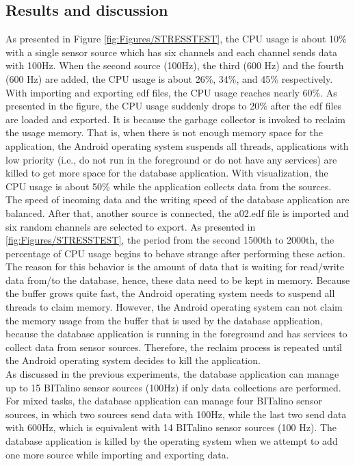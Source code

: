 \subsection{Results and discussion}
As presented in Figure \ref{fig:Figures/STRESSTEST}, the CPU usage is about 10\% with a single sensor source which has six channels and each channel sends data with 100Hz. When the second source (100Hz), the third (600 Hz) and the fourth (600 Hz) are added, the CPU usage is about 26\%, 34\%, and 45\% respectively. With importing and exporting edf files, the CPU usage reaches nearly 60\%. As presented in the figure, the CPU usage suddenly drops to 20\% after the edf files are loaded and exported. It is because the garbage collector is invoked to reclaim the usage memory. That is, when there is not enough memory space for the application, the Android operating system suspends all threads, applications with low priority (i.e., do not run in the foreground or do not have any services) are killed to get more space for the database application. With visualization, the CPU usage is about 50\% while the application collects data from the sources. The speed of incoming data and the writing speed of the database application are balanced. After that, another source is connected, the a02.edf file is imported and six random channels are selected to export. As presented in \ref{fig:Figures/STRESSTEST}, the period from the second 1500th to 2000th, the percentage of CPU usage begins to behave strange after performing these action. The reason for this behavior is the amount of data that is waiting for read/write data from/to the database, hence, these data need to be kept in memory. Because the buffer grows quite fast, the Android operating system needs to suspend all threads to claim memory. However, the Android operating system can not claim the memory usage from the buffer that is used by the database application, because the database application is running in the foreground and has services to collect data from sensor sources. Therefore, the reclaim process is repeated until the Android operating system decides to kill the application.\\
As discussed in the previous experiments, the database application can manage up to 15 BITalino sensor sources (100Hz) if only data collections are performed. For mixed tasks, the database application can manage four BITalino sensor sources, in which two sources send data with 100Hz, while the last two send data with 600Hz, which is equivalent with 14 BITalino sensor sources (100 Hz). The database application is killed by the operating system when we attempt to add one more source while importing and exporting data.\\
